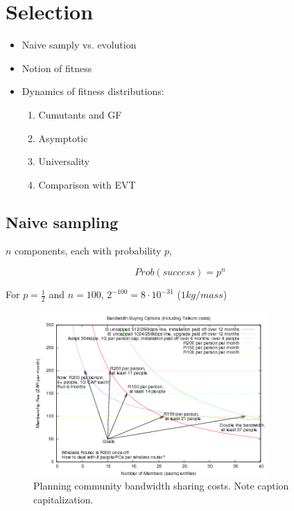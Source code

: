 \chapter{Selection}
\begin{itemize}
	\item Naive samply vs. evolution 
	\item Notion of fitness 
	\item Dynamics of fitness distributions: 
	\begin{enumerate}
		\item Cumutants and GF 
		\item Asymptotic 
		\item Universality 
		\item Comparison with EVT
	\end{enumerate}
\end{itemize}

\section{Naive sampling}

$n$ components, each with probability $p$,

$$Prob(success)= p^n$$

For $p=\frac{1}{2}$ and $n=100$, $2^{-100}=8\cdot 10^{-31}$ ($1kg/mass$)
\begin{figure}[!h]
\centering 
\includegraphics[width=0.8\textwidth]{images/bandwidth-colour.png}
\caption{Planning community bandwidth sharing costs. 
  Note caption capitalization.}
\label{bandwidth} 
\end{figure}

